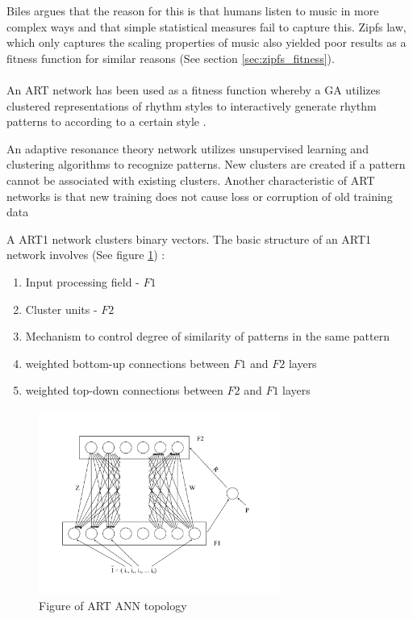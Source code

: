 Biles argues that the reason for this is that humans listen to music in more complex ways and that simple statistical measures fail to capture this. Zipfs law, which only captures the scaling properties of music also yielded poor results as a fitness function for similar reasons \cite{Dostal2013} (See section \ref{sec:zipfs_fitness}). 
\\
\\
An \ac{ART} network has been used as a fitness function whereby a \ac{GA} utilizes clustered representations of rhythm styles to interactively generate rhythm patterns to according to a certain style \cite{Burton97geneticalgorithm}.

An adaptive resonance theory network utilizes unsupervised learning and clustering algorithms to recognize patterns. New clusters are created if a pattern cannot be associated with existing clusters. Another characteristic of \ac{ART} networks is that new training does not cause loss or corruption of old training data \cite{carpenter2010adaptive}

A ART1 network clusters binary vectors. The basic structure of an ART1 network involves (See figure \ref{ims:ANN_art}) :
\begin{enumerate}
\item Input processing field - $F1$
\item Cluster units - $F2$
\item Mechanism to control degree of similarity of patterns in the same pattern
\item weighted bottom-up connections between $F1$ and $F2$ layers
\item weighted top-down connections between $F2$ and $F1$ layers
\end{enumerate}

\begin{figure}
\centering
\includegraphics[width=300px]{../images/ann_ART.png}
\caption{Figure of ART ANN topology}
\label{ims:ANN_art}
\end{figure}

